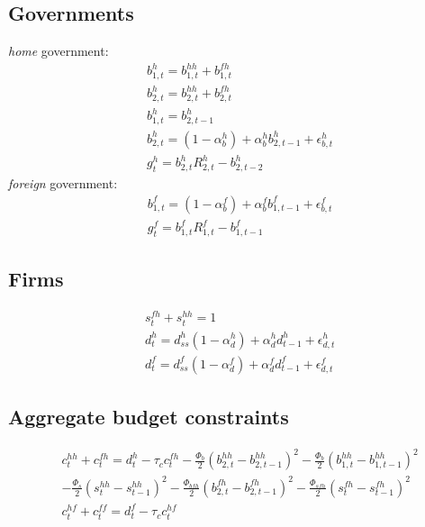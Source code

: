 \documentclass[a4paper]{article}
\begin{document}
\subsection{Governments}
\emph{home} government:
\begin{align}
&b^h_{1,t} = b^{hh}_{1,t} + b^{fh}_{1,t}\\
&b^h_{2,t} = b^{hh}_{2,t} + b^{fh}_{2,t}\\
&b^h_{1,t} = b^h_{2,t-1}\\
&b^h_{2,t} = (1-\alpha^h_{b})+\alpha^h_{b} b^h_{2,t-1}+\epsilon^h_{b,t}\\
&g^h_t	   = b^h_{2,t}R^h_{2,t}-b^h_{2,t-2}
\end{align}
\emph{foreign} government:
\begin{align}
&b^f_{1,t} = (1-\alpha^f_b) + \alpha^f_b b^f_{1,t-1}+\epsilon^f_{b,t}\\
&g^f_t 	= b^f_{1,t} R^f_{1,t}-b^f_{1,t-1}
\end{align}


\subsection{Firms}
\begin{align}
&s^{fh}_t+s^{hh}_t=1\\
&d^h_t=d^h_{ss} (1-\alpha^h_d) +\alpha^h_d d^h_{t-1} + \epsilon^h_{d,t}\\
&d^f_t=d^f_{ss} (1-\alpha^f_d) +\alpha^f_d d^f_{t-1} + \epsilon^f_{d,t}
\end{align}

\subsection{Aggregate budget constraints}
\begin{align}
&c^{hh}_t+c^{fh}_t=d^h_t - \tau_c c^{fh}_t -\frac{\Phi_b}{2}(b^{hh}_{2,t}-b^{hh}_{2,t-1})^2 - \frac{\Phi_b}{2}(b^{hh}_{1,t}-b^{hh}_{1,t-1})^2\\ \nonumber &-\frac{\Phi_s}{2}(s^{hh}_t-s^{hh}_{t-1})^2 - \frac{\Phi_{bfh}}{2}(b^{fh}_{2,t}-b^{fh}_{2,t-1})^2 -\frac{\Phi_{sfh}}{2}(s^{fh}_t-s^{fh}_{t-1})^2\\
&c^{hf}_t + c^{ff}_t = d^f_t - \tau_c c^{hf}_t
\end{align}
\end{document}

